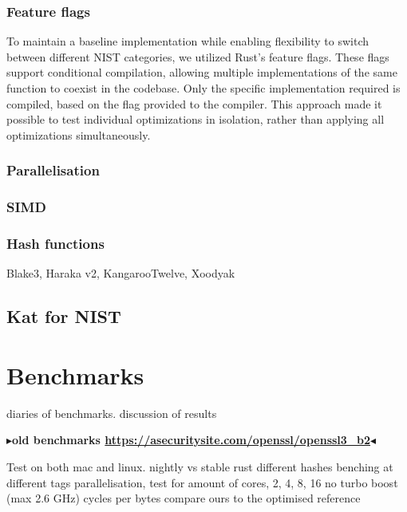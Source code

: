 \documentclass[twoside,11pt,openright]{report}
\theoremstyle{definition}
\theoremstyle{plain}
\newcommand{\todo}[1]{{\color[rgb]{.5,0,0}\textbf{$\blacktriangleright$#1$\blacktriangleleft$}}}
\begin{document}
\subsection{Feature flags}\label{sub:feature_flags} %
To maintain a baseline implementation while enabling flexibility to switch between different NIST categories, we utilized Rust's feature flags. These flags support conditional compilation, allowing multiple implementations of the same function to coexist in the codebase. Only the specific implementation required is compiled, based on the flag provided to the compiler. This approach made it possible to test individual optimizations in isolation, rather than applying all optimizations simultaneously.


\subsection{Parallelisation}\label{sub:rayon} %


\subsection{SIMD}\label{sub:simd} %


\subsection{Hash functions}
Blake3, Haraka v2, KangarooTwelve, Xoodyak

\section{Kat for NIST}\label{sub:kat_for_nist} %



\chapter{Benchmarks}\label{ch:bench}
diaries of benchmarks.
discussion of results

\todo{old benchmarks \url{https://asecuritysite.com/openssl/openssl3_b2}}

Test on both mac and linux.
nightly vs stable rust
different hashes
benching at different tags
parallelisation, test for amount of cores, 2, 4, 8, 16
no turbo boost (max 2.6 GHz)
cycles per bytes
compare ours to the optimised reference
\end{document}
